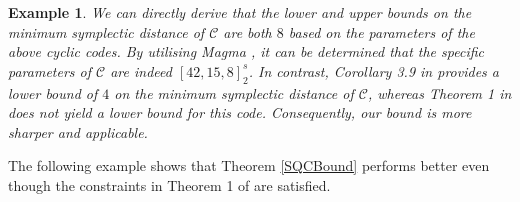 \documentclass[journal]{IEEEtran}
\newtheorem{example}{Example}
\begin{document}
\begin{example}
 
  

We can directly derive that the lower and upper bounds on the minimum symplectic distance of $\mathscr{C}$ are both $8$ based on the parameters of the above cyclic codes. 
 By utilising Magma \cite{bosma1997magma}, it can be determined that the specific parameters of $\mathscr{C}$ are indeed $\left[42,15,8\right]_2^s$. 
 In contrast, Corollary 3.9 in \cite{dastbasteh2023polynomial} provides a lower bound of $4$ on the minimum symplectic distance of $\mathscr{C}$, whereas Theorem 1 in \cite{GuanAdditive2023} does not yield a lower bound for this code. Consequently, our bound is more sharper and applicable.
\end{example}

The following example shows that Theorem \ref{SQCBound} performs better even though the constraints in Theorem 1 of \cite{GuanAdditive2023} are satisfied.
\end{document}

